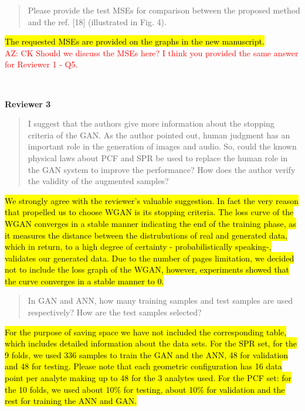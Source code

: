 \documentclass{article}
\begin{document}
	\begin{quote}
	Please provide the test MSEs for comparison between the proposed method and the ref. [18] (illustrated in Fig. 4).
	\end{quote}
	
	\hl{The requested MSEs are provided on the graphs in the new manuscript.} \\
	\textcolor{red}{AZ: CK Should we discuss the MSEs here? I think you provided the same answer for Reviewer 1 - Q5.}
	
	~
	
	{\bfseries\large Reviewer 3}
	
	\begin{quote}
	I suggest that the authors give more information about the stopping criteria of the GAN. As the author pointed out, human judgment has an important role in the generation of images and audio. So, could the known physical laws about PCF and SPR be used to replace the human role in the GAN system to improve the performance? How does the author verify the validity of the augmented samples?
	\end{quote}

	\hl{We strongly agree with the reviewer's valuable suggestion. In fact the very reason that propelled us to choose WGAN is its stopping criteria. The loss curve of the WGAN converges in a stable manner indicating the end of the training phase, as it measures the distance between the distrubutions of real and generated data, which in return, to a high degree of certainty - probabilistically speaking-, validates our generated data. Due to the number of pages limitation, we decided not to include the loss graph of the WGAN, however, experiments showed that the curve converges in a stable manner to 0.}	
	
	\begin{quote}
	 In GAN and ANN, how many training samples and test samples are used respectively? How are the test samples selected?
	\end{quote}
	
	\hl{For the purpose of saving space we have not included the corresponding table, which includes detailed information about the data sets. 
	For the SPR set,  for the 9 folds, we used 336 samples to train the GAN and the ANN, 48 for validation and 48 for testing. Please note that each geometric configuration has 16 data point per analyte making up to 48 for the 3 analytes used.
	For the PCF set: for the 10 folds, we used about 10$\%$ for testing, about 10$\%$ for validation and the rest for training the ANN and GAN.}	
	
\end{document}
